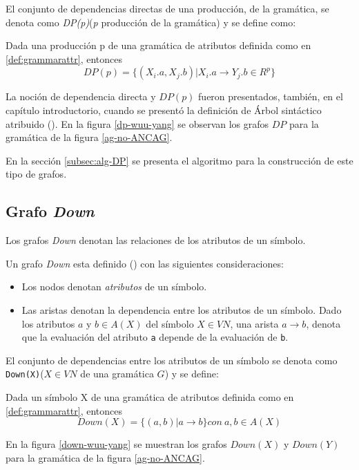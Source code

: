 El conjunto de dependencias directas de una producción, de la gramática, se denota como \textit{DP(p)}(\textit{p} producción de la gramática) y se define como:
\begin{definition}
Dada una producción p de una gramática de atributos definida como en \ref{def:grammarattr}, entonces
\begin{equation}
DP(p) = \{(X_{i}.a, X_{j}.b) | X_{i}.a \rightarrow Y_{j}.b \in R^{p} \}
\end{equation}
\end{definition}

La noción de dependencia directa y $DP(p)$ fueron presentados, también, en el capítulo introductorio, cuando se presentó la definición de Árbol sintáctico atribuido (\label{def:ast-attr}).  
En la figura \ref{dp-wuu-yang} se observan los grafos $DP$ para la gramática de la figura \ref{ag-no-ANCAG}.

En la sección \ref{subsec:alg-DP} se presenta el algoritmo para la construcción de este tipo de grafos.

\subsection{Grafo \textit{Down}}
Los grafos \textit{Down} denotan las relaciones de los atributos de un símbolo. 

Un grafo \textit{Down} esta definido (\cite{estruc-algorit}) con las siguientes consideraciones: 

\begin{itemize}
\item Los nodos denotan \textit{atributos} de un símbolo.
\item Las aristas denotan la dependencia entre los atributos de un símbolo. Dado los atributos $a$ y $b\in A(X)$ del símbolo $X\in VN$, una arista $a\rightarrow b$, denota que la evaluación del atributo \texttt{a} depende de la evaluación de \texttt{b}. 
\end{itemize}
El conjunto de dependencias entre los atributos de un símbolo se denota como  
\texttt{Down(X)}($X\in VN$ de una gramática $G$) y se define:
\begin{definition}
Dada un símbolo X de una gramática de atributos definida como en \ref{def:grammarattr}, entonces
\begin{equation}
Down(X) = \{(a,b) | a \rightarrow b \} con\ a,b \in A(X)
\end{equation}
\end{definition}
En la figura \ref{down-wuu-yang} se muestran los grafos $Down(X)$ y $Down(Y)$ para la gramática de la figura \ref{ag-no-ANCAG}.

